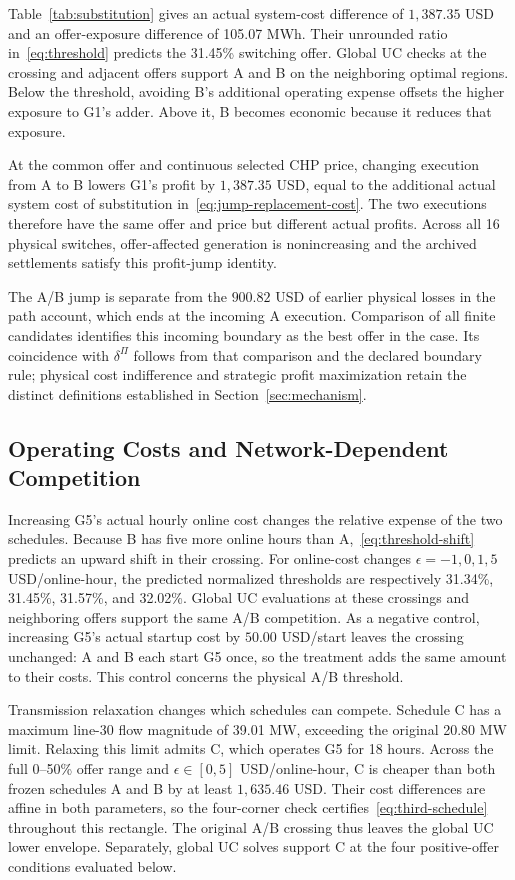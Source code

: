 \documentclass[journal]{IEEEtran}
\begin{document}
Table~\ref{tab:substitution} gives an actual system-cost difference of $1{,}387.35$ USD and an offer-exposure difference of 105.07 MWh. Their unrounded ratio in~\eqref{eq:threshold} predicts the 31.45\% switching offer. Global UC checks at the crossing and adjacent offers support A and B on the neighboring optimal regions. Below the threshold, avoiding B's additional operating expense offsets the higher exposure to G1's adder. Above it, B becomes economic because it reduces that exposure.

At the common offer and continuous selected CHP price, changing execution from A to B lowers G1's profit by $1{,}387.35$ USD, equal to the additional actual system cost of substitution in~\eqref{eq:jump-replacement-cost}. The two executions therefore have the same offer and price but different actual profits. Across all 16 physical switches, offer-affected generation is nonincreasing and the archived settlements satisfy this profit-jump identity.

The A/B jump is separate from the $900.82$ USD of earlier physical losses in the path account, which ends at the incoming A execution. Comparison of all finite candidates identifies this incoming boundary as the best offer in the case. Its coincidence with $\delta^{\Pi}$ follows from that comparison and the declared boundary rule; physical cost indifference and strategic profit maximization retain the distinct definitions established in Section~\ref{sec:mechanism}.

\subsection{Operating Costs and Network-Dependent Competition}\label{sec:results-conditions}
Increasing G5's actual hourly online cost changes the relative expense of the two schedules. Because B has five more online hours than A,~\eqref{eq:threshold-shift} predicts an upward shift in their crossing. For online-cost changes $\epsilon=-1,0,1,5$ USD/online-hour, the predicted normalized thresholds are respectively 31.34\%, 31.45\%, 31.57\%, and 32.02\%. Global UC evaluations at these crossings and neighboring offers support the same A/B competition. As a negative control, increasing G5's actual startup cost by $50.00$ USD/start leaves the crossing unchanged: A and B each start G5 once, so the treatment adds the same amount to their costs. This control concerns the physical A/B threshold.

Transmission relaxation changes which schedules can compete. Schedule C has a maximum line-30 flow magnitude of 39.01 MW, exceeding the original 20.80 MW limit. Relaxing this limit admits C, which operates G5 for 18 hours. Across the full 0--50\% offer range and $\epsilon\in[0,5]$ USD/online-hour, C is cheaper than both frozen schedules A and B by at least $1{,}635.46$ USD. Their cost differences are affine in both parameters, so the four-corner check certifies~\eqref{eq:third-schedule} throughout this rectangle. The original A/B crossing thus leaves the global UC lower envelope. Separately, global UC solves support C at the four positive-offer conditions evaluated below.
\end{document}
